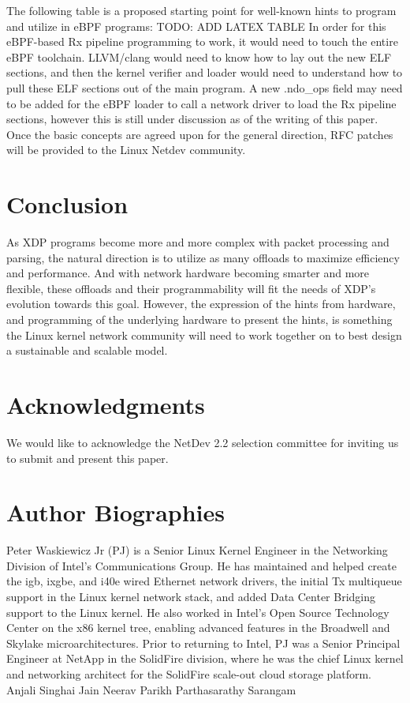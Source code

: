 \documentclass[letterpaper]{article}
\begin{document}
\indent The following table is a proposed starting point for well-known hints to program and utilize in eBPF programs:
TODO: ADD LATEX TABLE
\newline
\indent In order for this eBPF-based Rx pipeline programming to work, it would need to touch the entire eBPF toolchain. LLVM/clang would need to know how to lay out the new ELF sections, and then the kernel verifier and loader would need to understand how to pull these ELF sections out of the main program. A new .ndo\_ops field may need to be added for the eBPF loader to call a network driver to load the Rx pipeline sections, however this is still under discussion as of the writing of this paper. Once the basic concepts are agreed upon for the general direction, RFC patches will be provided to the Linux Netdev community.

\section{Conclusion}
As XDP programs become more and more complex with packet processing and parsing, the natural direction is to utilize as many offloads to maximize efficiency and performance. And with network hardware becoming smarter and more flexible, these offloads and their programmability will fit the needs of XDP's evolution towards this goal. However, the expression of the hints from hardware, and programming of the underlying hardware to present the hints, is something the Linux kernel network community will need to work together on to best design a sustainable and scalable model.

\section{Acknowledgments}
We would like to acknowledge the NetDev 2.2 selection committee for inviting us to submit and present this paper.




\section{Author Biographies}
Peter Waskiewicz Jr (PJ) is a Senior Linux Kernel Engineer in the Networking Division of Intel's Communications Group. He has maintained and helped create the igb, ixgbe, and i40e wired Ethernet network drivers, the initial Tx multiqueue support in the Linux kernel network stack, and added Data Center Bridging support to the Linux kernel. He also worked in Intel's Open Source Technology Center on the x86 kernel tree, enabling advanced features in the Broadwell and Skylake microarchitectures. Prior to returning to Intel, PJ was a Senior Principal Engineer at NetApp in the SolidFire division, where he was the chief Linux kernel and networking architect for the SolidFire scale-out cloud storage platform.
\newline
\newline
Anjali Singhai Jain
\newline
\newline
Neerav Parikh
\newline
\newline
Parthasarathy Sarangam
\end{document}
